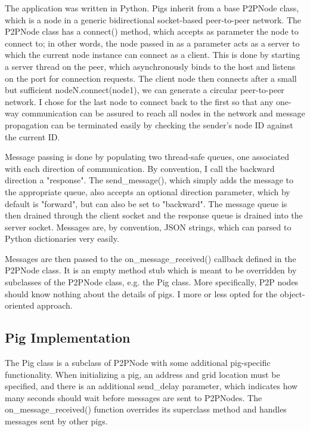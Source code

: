 \documentclass[]{article}
\begin{document}
The application was written in Python. Pigs inherit from a base P2PNode class, which is a node in a generic bidirectional socket-based peer-to-peer network. The P2PNode class has a connect() method, which accepts as parameter the node to connect to; in other words, the node passed in as a parameter acts as a server to which the current node instance can connect as a client. This is done by starting a server thread on the peer, which asynchronously binds to the host and listens on the port for connection requests. The client node then connects after a small but sufficient nodeN.connect(node1), we can generate a circular peer-to-peer network. I chose for the last node to connect back to the first so that any one-way communication can be assured to reach all nodes in the network and message propagation can be terminated easily by checking the sender's node ID against the current ID.

Message passing is done by populating two thread-safe queues, one associated with each direction of communication. By convention, I call the backward direction a "response". The send\_message(), which simply adds the message to the appropriate queue, also accepts an optional direction parameter, which by default is "forward", but can also be set to "backward". The message queue is then drained through the client socket and the response queue is drained into the server socket. Messages are, by convention, JSON strings, which can parsed to Python dictionaries very easily.

Messages are then passed to the on\_message\_received() callback defined in the P2PNode class. It is an empty method stub which is meant to be overridden by subclasses of the P2PNode class, e.g. the Pig class. More specifically, P2P nodes should know nothing about the details of pigs. I more or less opted for the object-oriented approach.

\subsection{Pig Implementation}

The Pig class is a subclass of P2PNode with some additional pig-specific functionality. When initializing a pig, an address and grid location must be specified, and there is an additional send\_delay parameter, which indicates how many seconds should wait before messages are sent to P2PNodes. The on\_message\_received() function overrides its superclass method and handles messages sent by other pigs.
\end{document}
